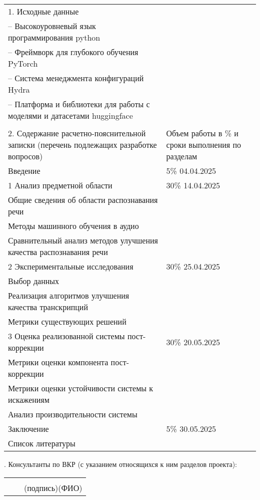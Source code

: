 {\begin{longtable}{p{}|p{}}
1. Исходные данные\\
-- Высокоуровневый язык программирования python \\
-- Фреймворк для глубокого обучения PyTorch \\
-- Система менеджмента конфигураций Hydra \\
-- Платформа и библиотеки для работы с моделями и датасетами huggingface \\
\\
2. Содержание расчетно-пояснительной записки (перечень подлежащих разработке вопросов)
& Объем работы в \% и сроки выполнения по разделам\\
Введение & 5\% \hfill 04.04.2025\\
1 Анализ предметной области & 30\% \hfill 14.04.2025\\
Общие сведения об области распознавания речи\\
Методы машинного обучения в аудио\\
Сравнительный анализ методов улучшения качества распознавания речи \\
2 Экспериментальные исследования & 30\% \hfill 25.04.2025 \\
Выбор данных \\
Реализация алгоритмов улучшения качества транскрипций\\
Метрики существующих решений\\
3 Оценка реализованной системы пост-коррекции & 30\% \hfill 20.05.2025\\
Метрики оценки компонента пост-коррекции\\
Метрики оценки устойчивости системы к искажениям\\
Анализ производительности системы\\
Заключение & 5\% \hfill 30.05.2025\\
Список литературы & \\
\end{longtable}

. Консультанты по ВКР (с указанием относящихся к ним разделов проекта):
\vspace{2em}

\noindent
\begin{tabular}{@{}p{}p{}p{}@{}}
 &  & \hrulefill \hspace{2em}\hrulefill\\
 & & \centering\footnotesize (подпись)\hspace{8em}(ФИО)\\
 

\end{tabular}}
